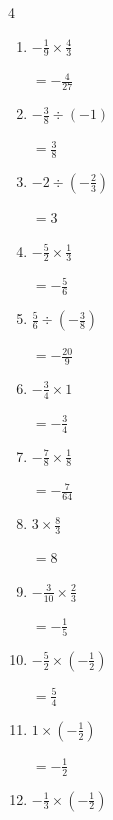 \begin{multicols}{4}
\begin{enumerate}
  \item $\displaystyle -\frac{1}{9}\times{}\frac{4}{3}$

        $\displaystyle =-\frac{4}{27}$

\columnbreak %

  \item $\displaystyle -\frac{3}{8}\div{}\left(-1\right)$

        $\displaystyle =\frac{3}{8}$

  \item $\displaystyle -2\div{}\left(-\frac{2}{3}\right)$

        $\displaystyle =3$

  \item $\displaystyle -\frac{5}{2}\times{}\frac{1}{3}$

        $\displaystyle =-\frac{5}{6}$

  \item $\displaystyle \frac{5}{6}\div{}\left(-\frac{3}{8}\right)$

        $\displaystyle =-\frac{20}{9}$

  \item $\displaystyle -\frac{3}{4}\times{}1$

        $\displaystyle =-\frac{3}{4}$

  \item $\displaystyle -\frac{7}{8}\times{}\frac{1}{8}$

        $\displaystyle =-\frac{7}{64}$

  \item $\displaystyle 3\times{}\frac{8}{3}$

        $\displaystyle =8$

  \item $\displaystyle -\frac{3}{10}\times{}\frac{2}{3}$

        $\displaystyle =-\frac{1}{5}$

  \item $\displaystyle -\frac{5}{2}\times{}\left(-\frac{1}{2}\right)$

        $\displaystyle =\frac{5}{4}$

  \item $\displaystyle 1\times{}\left(-\frac{1}{2}\right)$

        $\displaystyle =-\frac{1}{2}$

\columnbreak %

  \item $\displaystyle -\frac{1}{3}\times{}\left(-\frac{1}{2}\right)$


\end{enumerate}
\end{multicols}

